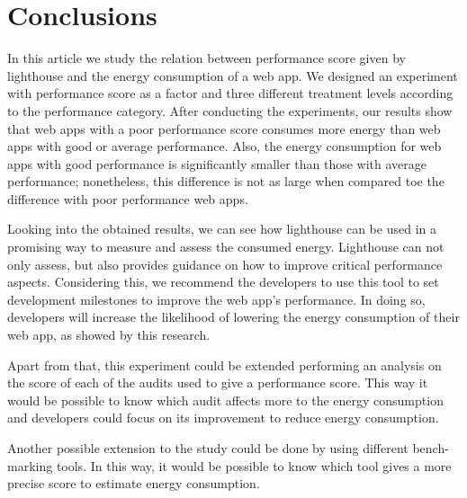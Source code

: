 \section{Conclusions}\label{sec:conclusions}

In this article we study the relation between performance score given by lighthouse and the energy consumption of a web app. We designed an experiment with performance score as a factor and three different treatment levels according to the performance category. After conducting the experiments, our results show that web apps with a poor performance score consumes more energy than web apps with good or average performance. Also, the energy consumption for web apps with good performance is significantly smaller than those with average performance; nonetheless, this difference is not as large when compared toe the difference with poor performance web apps. \newline 

Looking into the obtained results, we can see how lighthouse can be used in a promising way to measure and assess the consumed energy. Lighthouse can not only assess, but also provides guidance on how to improve critical performance aspects. Considering this, we recommend the developers to use this tool to set development milestones to improve the web app's performance. In doing so,  developers will increase the likelihood of lowering the energy consumption of their web app, as showed by this research.
\newline

Apart from that, this experiment could be extended performing an analysis on the score of each of the audits used to give a performance score. This way it would be possible to know which audit affects more to the energy consumption and developers could focus on its improvement to reduce energy consumption. \newline

Another possible extension to the study could be done by using different bench-marking tools. In this way, it would be possible to know which tool gives a more precise score to estimate energy consumption.
